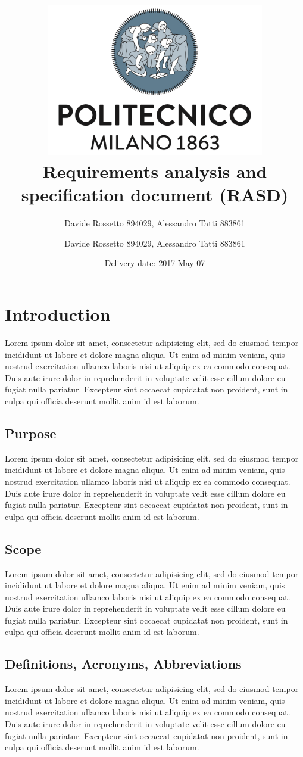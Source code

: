 \documentclass[10pt,a4paper]{report}
\author{Davide Rossetto 894029, Alessandro Tatti 883861} %
\title{ \includegraphics[width=95mm]{imm/PolimiLogo.png} 
	\\Requirements analysis and specification document (RASD)}
\author{Davide Rossetto 894029, Alessandro Tatti 883861}
\date{Delivery date: 2017 May 07}
\begin{document}
	
	\maketitle
	\newpage
	\tableofcontents
	\newpage
	
	\chapter{Introduction}
	Lorem ipsum dolor sit amet, consectetur adipisicing elit, sed do eiusmod
	tempor incididunt ut labore et dolore magna aliqua. Ut enim ad minim veniam,
	quis nostrud exercitation ullamco laboris nisi ut aliquip ex ea commodo
	consequat. Duis aute irure dolor in reprehenderit in voluptate velit esse
	cillum dolore eu fugiat nulla pariatur. Excepteur sint occaecat cupidatat non
	proident, sunt in culpa qui officia deserunt mollit anim id est laborum.
	
	\section{Purpose}
	Lorem ipsum dolor sit amet, consectetur adipisicing elit, sed do eiusmod
	tempor incididunt ut labore et dolore magna aliqua. Ut enim ad minim veniam,
	quis nostrud exercitation ullamco laboris nisi ut aliquip ex ea commodo
	consequat. Duis aute irure dolor in reprehenderit in voluptate velit esse
	cillum dolore eu fugiat nulla pariatur. Excepteur sint occaecat cupidatat non
	proident, sunt in culpa qui officia deserunt mollit anim id est laborum.
	
	\section{Scope}
	Lorem ipsum dolor sit amet, consectetur adipisicing elit, sed do eiusmod
	tempor incididunt ut labore et dolore magna aliqua. Ut enim ad minim veniam,
	quis nostrud exercitation ullamco laboris nisi ut aliquip ex ea commodo
	consequat. Duis aute irure dolor in reprehenderit in voluptate velit esse
	cillum dolore eu fugiat nulla pariatur. Excepteur sint occaecat cupidatat non
	proident, sunt in culpa qui officia deserunt mollit anim id est laborum.
	
	\section{Definitions, Acronyms, Abbreviations}
	Lorem ipsum dolor sit amet, consectetur adipisicing elit, sed do eiusmod
	tempor incididunt ut labore et dolore magna aliqua. Ut enim ad minim veniam,
	quis nostrud exercitation ullamco laboris nisi ut aliquip ex ea commodo
	consequat. Duis aute irure dolor in reprehenderit in voluptate velit esse
	cillum dolore eu fugiat nulla pariatur. Excepteur sint occaecat cupidatat non
	proident, sunt in culpa qui officia deserunt mollit anim id est laborum.
	
\end{document}
